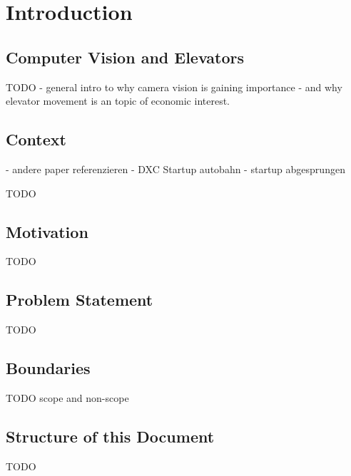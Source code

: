 \chapter{Introduction}
\label{chap:intro}

\section{Computer Vision and Elevators}



TODO
- general intro to why camera vision is gaining importance 
- and why elevator movement is an topic of economic interest.


\section{Context}

- andere paper referenzieren
- DXC Startup autobahn 
- startup abgesprungen

TODO

\section{Motivation}

TODO

\section{Problem Statement}

TODO

\section{Boundaries}

TODO scope and non-scope

\section{Structure of this Document}

TODO